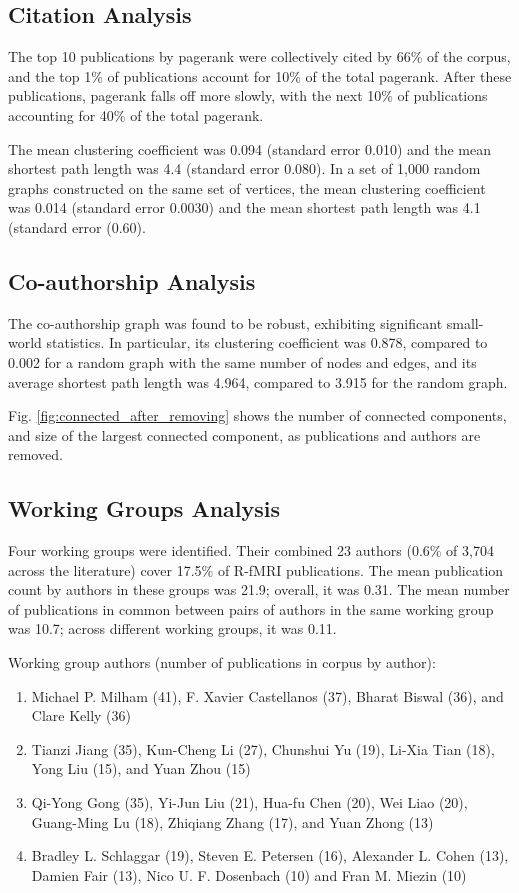 \documentclass[5p]{elsarticle}
\begin{document}
\subsection{Citation Analysis} 
The top 10 publications by pagerank were collectively cited by 66\% of the
corpus, and the top 1\% of publications account for 10\% of the total
pagerank.  After these publications, pagerank falls off more slowly, with
the next 10\% of publications accounting for 40\% of the total pagerank. 

The mean clustering coefficient was 0.094 (standard error 0.010) and the
mean shortest path length was 4.4 (standard error 0.080). In a set of
1,000 random graphs constructed on the same set of vertices, the mean
clustering coefficient was 0.014 (standard error 0.0030) and the mean
shortest path length was 4.1 (standard error (0.60).

\subsection{Co-authorship Analysis} The co-authorship graph was found to
be robust, exhibiting significant small-world statistics. In particular,
its clustering coefficient was 0.878, compared to 0.002 for a random graph
with the same number of nodes and edges, and its average shortest path
length was 4.964, compared to 3.915 for the random graph.

Fig. \ref{fig:connected_after_removing} shows the number of connected components, and
size of the largest connected component, as publications and authors are
removed.  

\subsection{Working Groups Analysis}
Four working groups were identified. Their combined 23 authors (0.6\% of
3,704 across the literature) cover 17.5\% of R-fMRI publications. The mean
publication count by authors in these groups was 21.9; overall, it was
0.31. The mean number of publications in common between pairs of authors
in the same working group was 10.7; across different working groups, it
was 0.11.  

Working group authors (number of publications in corpus by author):
\begin{enumerate}
\item Michael P. Milham (41), F. Xavier Castellanos (37), Bharat Biswal
(36), and Clare Kelly (36)
\item Tianzi Jiang (35), Kun-Cheng Li (27), Chunshui Yu (19), Li-Xia Tian
(18), Yong Liu (15), and Yuan Zhou (15)
\item Qi-Yong Gong (35), Yi-Jun Liu (21), Hua-fu Chen (20), Wei Liao (20),
Guang-Ming Lu (18), Zhiqiang Zhang (17), and Yuan Zhong (13) 
\item Bradley L. Schlaggar (19), Steven E. Petersen (16), Alexander L.
Cohen (13), Damien Fair (13), Nico U. F. Dosenbach (10) and Fran M. Miezin
(10)
\end{enumerate}
\end{document}
